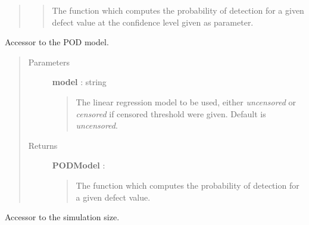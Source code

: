 \documentclass[letterpaper,10pt,english]{sphinxmanual}
\begin{document}
\begin{fulllineitems}
\begin{fulllineitems}
\begin{quote}
\begin{description}
\begin{quote}
The function which computes the probability of detection for a given
defect value at the confidence level given as parameter.
\end{quote}

\end{description}\end{quote}

\end{fulllineitems}


\begin{fulllineitems}
\label{_generated/otpod.UnivariateLinearModelPOD:otpod.UnivariateLinearModelPOD.getPODModel}
Accessor to the POD model.
\begin{quote}\begin{description}
\item[{Parameters}] \leavevmode
\textbf{model} : string
\begin{quote}

The linear regression model to be used, either \emph{uncensored} or
\emph{censored} if censored threshold were given. Default is \emph{uncensored}.
\end{quote}

\item[{Returns}] \leavevmode
\textbf{PODModel} : \href{http://doc.openturns.org/openturns-latest/sphinx/user\_manual/\_generated/openturns.NumericalMathFunction.html\#openturns.NumericalMathFunction}{}
\begin{quote}

The function which computes the probability of detection for a given
defect value.
\end{quote}

\end{description}\end{quote}

\end{fulllineitems}


\begin{fulllineitems}
\label{_generated/otpod.UnivariateLinearModelPOD:otpod.UnivariateLinearModelPOD.getSimulationSize}
Accessor to the simulation size.

\end{fulllineitems}


\end{fulllineitems}
\end{document}
